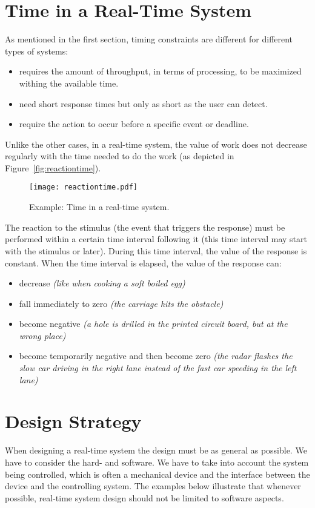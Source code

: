 \documentclass[../main.tex]{subfiles}
\begin{document}
\section{Time in a Real-Time System}
As mentioned in the first section, timing constraints are different for different types of systems:
\begin{itemize}
	\item {} requires the amount of throughput, in terms of processing, to be maximized withing the available time.
	\item {} need short response times but only as short as the user can detect.
	\item {} require the action to occur before a specific event or deadline.
\end{itemize}
Unlike the other cases, in a real-time system, the value of work does not decrease regularly with the time needed to do the work (as depicted in Figure~\ref{fig:reactiontime}).

\begin{figure}[H]
    \centering
    \texttt{[image: reactiontime.pdf]}
    \caption{Example: Time in a real-time system. \label{fig:reactiontime}}
    \label{rttime}
\end{figure}
The reaction to the stimulus (the event that triggers the response) must be performed within a certain time interval following it (this time interval may start with the stimulus or later). During this time interval, the value of the response is constant. When the time interval is elapsed, the value of the response can:
\begin{itemize}
	\item decrease \textit{(like when cooking a soft boiled egg)}
	\item fall immediately to zero \textit{(the carriage hits the obstacle)}
	\item become negative \textit{(a hole is drilled in the printed circuit board, but at the wrong place)}
	\item become temporarily negative and then become zero\textit{ (the radar flashes the slow car driving in the right lane instead of the fast car speeding in the left lane)}
\end{itemize}

\section{Design Strategy}
When designing a real-time system the design must be as general as possible. We have to consider the hard- and software. We have to take into account the system being controlled, which is often a mechanical device and the interface between the device and the controlling system. The examples below illustrate that whenever possible, real-time system design should not be limited to software aspects.
\end{document}
